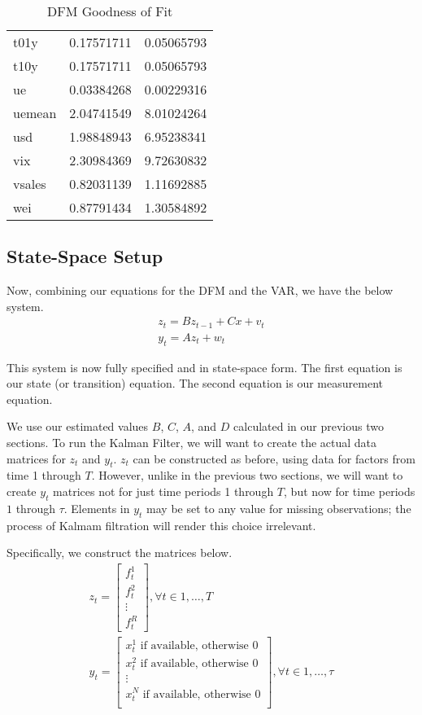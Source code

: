 \documentclass[11pt, letterpaper]{article}\usepackage[]{graphicx}\usepackage[]{color}
\begin{document}
\begin{table}[H]
\begin{tabular}{lrr}
  t01y & 0.17571711 & 0.05065793 \\ 
  t10y & 0.17571711 & 0.05065793 \\ 
  ue & 0.03384268 & 0.00229316 \\ 
  uemean & 2.04741549 & 8.01024264 \\ 
  usd & 1.98848943 & 6.95238341 \\ 
  vix & 2.30984369 & 9.72630832 \\ 
  vsales & 0.82031139 & 1.11692885 \\ 
  wei & 0.87791434 & 1.30584892 \\ 
   \hline
\end{tabular}
\endgroup
\caption{DFM Goodness of Fit} 
\end{table}





\subsection{State-Space Setup}
Now, combining our equations for the DFM and the VAR, we have the below system.
\begin{align*}
z_t = B z_{t-1} + Cx + v_t\\
y_t = A z_t + w_t
\end{align*}

This system is now fully specified and in state-space form. The first equation is our state (or transition) equation. The second equation is our measurement equation. 

We use our estimated values $B$, $C$, $A$, and $D$ calculated in our previous two sections. To run the Kalman Filter, we will want to create the actual data matrices for $z_t$ and $y_t$. $z_t$ can be constructed as before, using data for factors from time 1 through $T$. However, unlike in the previous two sections, we will want to create $y_t$ matrices not for just time periods 1 through $T$, but now for time periods $1$ through $\tau$. Elements in $y_t$ may be set to any value for missing observations; the process of Kalmam filtration will render this choice irrelevant.

Specifically, we construct the matrices below.
\begin{align*}
z_t
=
\begin{bmatrix}
	f^1_{t}\\
	f^2_{t}\\
	\vdots \\
	f^R_{t}
\end{bmatrix}, \forall t \in 1, \dots, T\\
y_t
=
\begin{bmatrix}
	\text{$x^1_{t}$ if available, otherwise 0}\\
	\text{$x^2_{t}$ if available, otherwise 0}\\
	\vdots \\
	\text{$x^N_{t}$ if available, otherwise 0}\\
\end{bmatrix}, \forall t \in 1, \dots, \tau
\end{align*}
\end{document}
